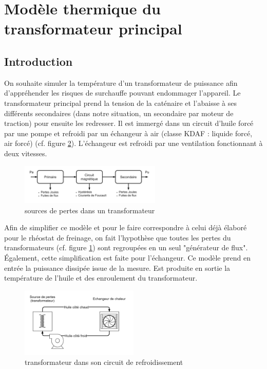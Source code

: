\documentclass[a4paper]{report}
\begin{document}
	\section{Modèle thermique du transformateur principal}
	\subsection{Introduction}
	On souhaite simuler la température d'un transformateur de puissance afin d'appréhender les risques de surchauffe pouvant endommager l'appareil.
	Le transformateur principal prend la tension de la caténaire et l'abaisse à ses différents secondaires (dans notre situation, un secondaire par moteur de traction) pour ensuite les redresser. Il est immergé dans un circuit d'huile forcé par une pompe et refroidi par un échangeur à air (classe KDAF : liquide forcé, air forcé) (cf. figure \ref{schema:transfo}). L'échangeur est refroidi par une ventilation fonctionnant à deux vitesses.\\
	
		\begin{figure}[h]
		\centering
		\includegraphics[width=0.6\textwidth]{schema_ptransfo}
		\caption{sources de pertes dans un transformateur}
		\label{schema:ptransfo}
	\end{figure}

	Afin de simplifier ce modèle et pour le faire correspondre à celui déjà élaboré pour le rhéostat de freinage, on fait l'hypothèse que toutes les pertes du transformateurs (cf. figure \ref{schema:ptransfo}) sont regroupées en un seul "générateur de flux". Également, cette simplification est faite pour l'échangeur.
	Ce modèle prend en entrée la puissance dissipée issue de la mesure. Est produite en sortie la température de l'huile et des enroulement du transformateur. 



	
	\begin{figure}[h]
		\centering
		\includegraphics[width=0.5\textwidth]{schema_transfo}
		\caption{transformateur dans son circuit de refroidissement}
		\label{schema:transfo}
	\end{figure}
	
\end{document}
